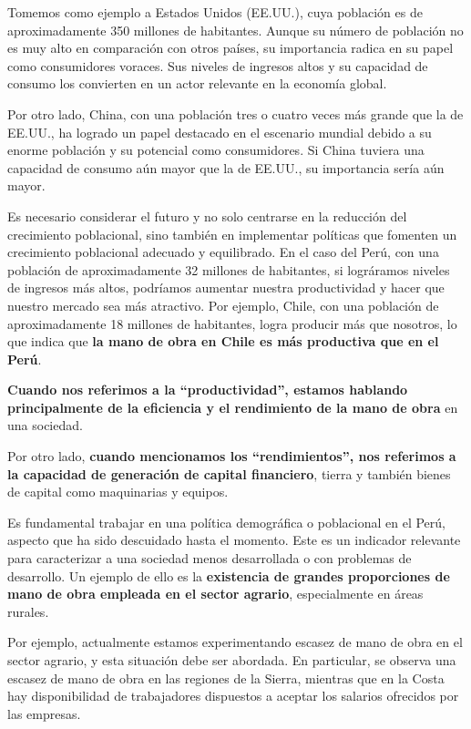 \documentclass[
  a4paper,
]{article}
\begin{document}
Tomemos como ejemplo a Estados Unidos (EE.UU.), cuya población es de
aproximadamente 350 millones de habitantes. Aunque su número de
población no es muy alto en comparación con otros países, su importancia
radica en su papel como consumidores voraces. Sus niveles de ingresos
altos y su capacidad de consumo los convierten en un actor relevante en
la economía global.

Por otro lado, China, con una población tres o cuatro veces más grande
que la de EE.UU., ha logrado un papel destacado en el escenario mundial
debido a su enorme población y su potencial como consumidores. Si China
tuviera una capacidad de consumo aún mayor que la de EE.UU., su
importancia sería aún mayor.

Es necesario considerar el futuro y no solo centrarse en la reducción
del crecimiento poblacional, sino también en implementar políticas que
fomenten un crecimiento poblacional adecuado y equilibrado. En el caso
del Perú, con una población de aproximadamente 32 millones de
habitantes, si lográramos niveles de ingresos más altos, podríamos
aumentar nuestra productividad y hacer que nuestro mercado sea más
atractivo. Por ejemplo, Chile, con una población de aproximadamente 18
millones de habitantes, logra producir más que nosotros, lo que indica
que \textbf{la mano de obra en Chile es más productiva que en el Perú}.

\textbf{Cuando nos referimos a la ``productividad'', estamos hablando
principalmente de la eficiencia y el rendimiento de la mano de obra} en
una sociedad.

Por otro lado, \textbf{cuando mencionamos los ``rendimientos'', nos
referimos a la capacidad de generación de capital financiero}, tierra y
también bienes de capital como maquinarias y equipos.

Es fundamental trabajar en una política demográfica o poblacional en el
Perú, aspecto que ha sido descuidado hasta el momento. Este es un
indicador relevante para caracterizar a una sociedad menos desarrollada
o con problemas de desarrollo. Un ejemplo de ello es la
\textbf{existencia de grandes proporciones de mano de obra empleada en
el sector agrario}, especialmente en áreas rurales.

Por ejemplo, actualmente estamos experimentando escasez de mano de obra
en el sector agrario, y esta situación debe ser abordada. En particular,
se observa una escasez de mano de obra en las regiones de la Sierra,
mientras que en la Costa hay disponibilidad de trabajadores dispuestos a
aceptar los salarios ofrecidos por las empresas.
\end{document}
